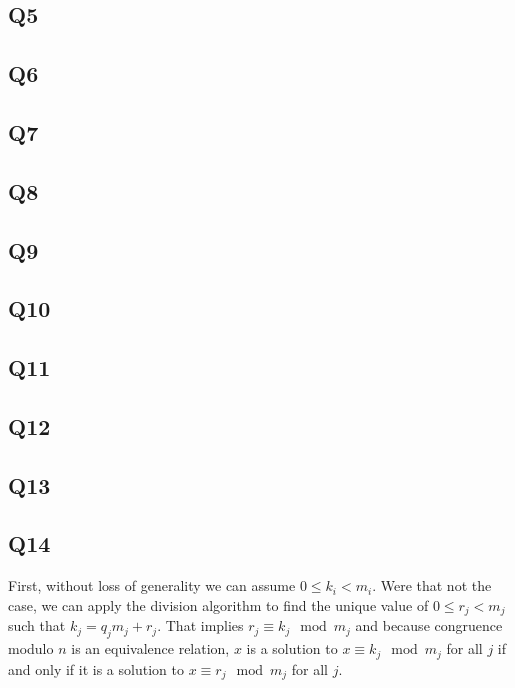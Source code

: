 \documentclass[12pt]{article}
\numberwithin{theorem}{section}
\numberwithin{equation}{section}
\numberwithin{remark}{section}
\numberwithin{definition}{section}
\numberwithin{theorem}{section}
\numberwithin{lemma}{section}
\numberwithin{example}{section}
\begin{document}
\subsection{Q5}

\subsection{Q6}

\subsection{Q7}

\subsection{Q8}

\subsection{Q9}

\subsection{Q10}

\subsection{Q11}

\subsection{Q12}

\subsection{Q13}

\subsection{Q14}

First, without loss of generality we can assume $0\le k_i < m_i$. Were that not the case, we can apply the division algorithm to find the unique value of $0\le r_j < m_j$ such that $k_j=q_jm_j+r_j$. That implies $r_j\equiv k_j\mod{m_j}$ and because congruence modulo $n$ is an equivalence relation, $x$ is a solution to $x\equiv k_j \mod{m_j}$ for all $j$ if and only if it is a solution to $x\equiv r_j \mod{m_j}$ for all $j$.
\end{document}
